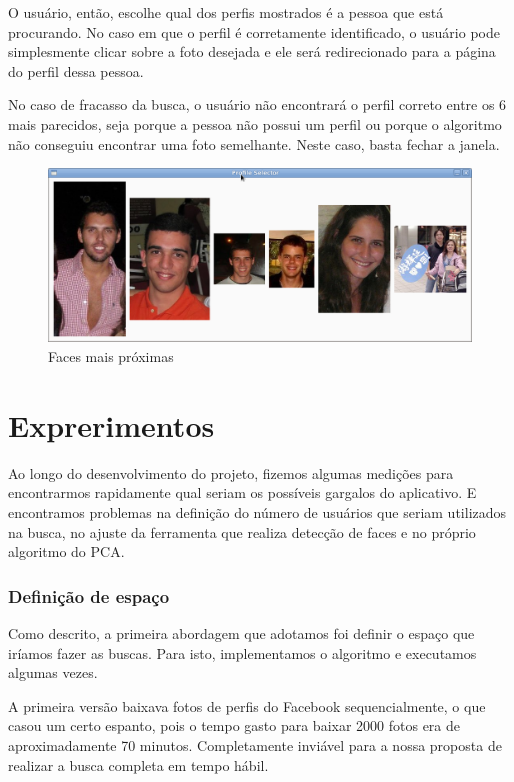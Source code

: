\documentclass[10pt,a4paper]{article}
\begin{document}
O usuário, então,  escolhe qual dos perfis mostrados é a pessoa que está procurando. No caso em que o perfil é corretamente identificado, o usuário pode simplesmente clicar sobre a foto desejada e ele será redirecionado para a página do perfil dessa pessoa.

No caso de fracasso da busca, o usuário não encontrará o perfil correto entre os 6 mais parecidos, seja porque a pessoa não possui um perfil ou porque o algoritmo não conseguiu encontrar uma foto semelhante. Neste caso, basta fechar a janela.

  \begin{figure}[h!]
    \begin{center}
      \includegraphics[scale=0.4]{6maisproximos}
      \caption{Faces mais próximas}
    \end{center}
  \end{figure}


\section{Exprerimentos}%
Ao longo do desenvolvimento do projeto, fizemos algumas medições para encontrarmos
rapidamente qual seriam os possíveis gargalos do aplicativo. E encontramos problemas na definição do número de usuários que seriam utilizados na busca, no ajuste da ferramenta que realiza detecção de faces e no próprio algoritmo do PCA.

\subsubsection*{Definição de espaço}%
Como descrito, a primeira abordagem que adotamos foi definir o espaço que iríamos fazer as buscas. Para isto, implementamos o algoritmo e executamos algumas vezes.

	A primeira versão baixava fotos de perfis do Facebook sequencialmente, o que casou um certo espanto, pois o tempo gasto para baixar 2000 fotos era de aproximadamente 70 minutos. Completamente inviável para a nossa proposta de realizar a busca completa em tempo hábil.
\end{document}
